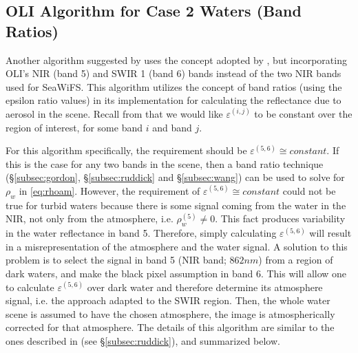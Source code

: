 \subsection{OLI Algorithm for Case 2 Waters (Band Ratios)}
\label{subsec:bandratios}
Another algorithm suggested by \citet{GeraceThesis} uses the concept adopted by \citet{Ruddick:2000bs}, but incorporating OLI's NIR (band 5) and SWIR 1 (band 6) bands instead of the two NIR bands used for SeaWiFS. This algorithm utilizes the concept of band ratios (using the epsilon ratio values) in its implementation for calculating the reflectance due to aerosol in the scene. Recall from \citet{Ruddick:2000bs} that we would like $\varepsilon^{(i,j)}$ to be constant over the region of interest, for some band $i$ and band $j$. 

For this algorithm specifically, the requirement should be $\varepsilon^{(5,6)}\cong constant$. If this is the case for any two bands in the scene, then a band ratio technique (\S\ref{subsec:gordon}, \S\ref{subsec:ruddick} and \S\ref{subsec:wang}) can be used to solve for $\rho_w$ in \autoref{eq:rhoam}. However, the requirement of $\varepsilon^{(5,6)}\cong constant$ could not be true for turbid waters because there is some signal coming from the water in the NIR, not only from the atmosphere, i.e. $\rho_w^{(5)}\neq0$. This fact produces variability in the water reflectance in band 5. Therefore, simply calculating $\varepsilon^{(5,6)}$ will result in a misrepresentation of the atmosphere and the water signal. A solution to this problem is to select the signal in band 5 (NIR band; $862nm$) from a region of dark waters, and make the black pixel assumption in band 6. This will allow one to calculate $\varepsilon^{(5,6)}$ over dark water and therefore determine its atmosphere signal, i.e. the \citet{Ruddick:2000bs} approach adapted to the SWIR region. Then, the whole water scene is assumed to have the chosen atmosphere, the image is atmospherically corrected for that atmosphere. The details of this algorithm are similar to the ones described in \citet{Ruddick:2000bs} (see \S\ref{subsec:ruddick}), and summarized below.

